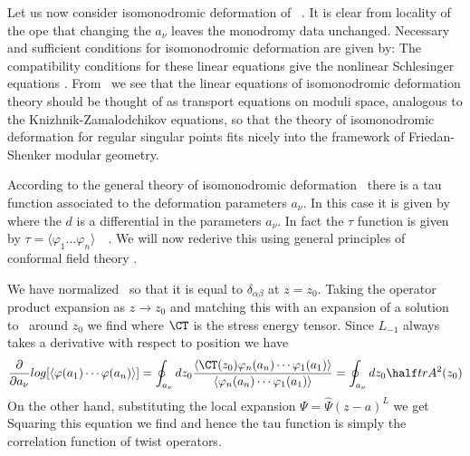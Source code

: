 Let us now consider isomonodromic deformation of \diffl\ .
It is clear from locality of the ope that changing the 
$a_\nu$ leaves the monodromy data unchanged. 
Necessary and sufficient conditions
for isomonodromic deformation are given by:
\eqn{}
The
compatibility conditions for these linear equations give the 
nonlinear Schlesinger equations
.
From \corr\ we see that the linear equations of
isomonodromic deformation theory should 
be thought of as transport equations on moduli space, 
analogous to the Knizhnik-Zamalodchikov equations,
so that the theory of isomonodromic deformation
for regular singular points fits nicely 
into the framework of Friedan-Shenker modular geometry.

According to the general theory 
of isomonodromic deformation \Jimboi\Jimboii\Jimboiii\ there is 
a tau function associated to the deformation parameters $a_\nu$.
In this case it is given by 
\eqn{}
where the $d$ is a differential in the parameters $a_\nu$. 
In fact the $\tau$ function is given by
$\tau=\langle \varphi_1\dots\varphi_n\rangle$\ 
\Jimboi\Jimboii\Jimboiii\ .
We will now rederive this
using general principles of conformal field theory
.

We have normalized \corr\ so that it is equal to $\delta_{\alpha\beta}$
at $z=z_0$. Taking the 
operator product expansion as $z\to z_0$ and matching this with 
an expansion of a solution to \diffl\ around $z_0$ we find
\eqn{}
where 
$\CT$ is the stress energy tensor. Since $L_{-1}$ always takes a
derivative with respect to position we have
$${\p\over\p a_\nu}log[\langle\varphi(a_1)\cdots\varphi(a_n)\rangle]
=
\oint_{a_\nu}dz_0
{\langle
\CT(z_0) \varphi_n(a_n)\cdots \varphi_1(a_1)
\rangle\over
\langle \varphi_n(a_n)\cdots\varphi_1(a_1)\rangle } 
=
\oint_{a_\nu}dz_0 \half trA^2(z_0)$$
On the other hand, substituting the local expansion 
$\Psi=\hat\Psi(z-a)^L$ we get
\eqn{}
Squaring this equation we find
\eqn{}
and hence the tau function is simply the correlation function 
of twist operators. 

